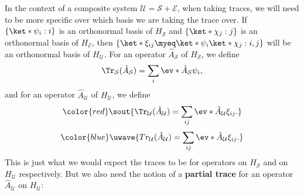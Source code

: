 \documentclass[12pt]{report}
\providecommand{\DIFadd}[1]{{\protect\color{blue}\uwave{#1}}} %
\providecommand{\DIFdel}[1]{{\protect\color{red}\sout{#1}}}                      %
\providecommand{\DIFaddbegin}{} %
\providecommand{\DIFaddend}{} %
\providecommand{\DIFdelbegin}{} %
\providecommand{\DIFdelend}{} %
\begin{document}
    In the context of a composite system $\mathcal{U}=\mathcal{S}+\mathcal{E}$, 
    when taking traces, we will need to be more specific over which basis we are taking the trace over. 
     If $\{\ket*{\psi_i}:i\}$ is an orthonormal basis of $H_\mathcal{S}$ and $\{\ket*{\chi_j}:j\}$ 
     is an orthonormal basis of $H_\mathcal{E}$, 
     then $\{\ket*{\xi_{ij}}\myeq\ket*{\psi_i}\ket*{\chi_j}:i,j\}$ 
     will be an orthonormal basis of $H_\mathcal{U}$. 
     For an operator $\hat{A}_\mathcal{S}$ of $H_\mathcal{S}$, we define 
    $$\Tr_\mathcal{S}(\hat{A}_\mathcal{S})=\sum_i \ev*{\hat{A}_\mathcal{S}}{\psi_i},$$
     and for an operator $\hat{A}_\mathcal{U}$ of $H_\mathcal{U}$, we define 
     \DIFdelbegin \begin{displaymath}\DIFdel{\Tr_\mathcal{U}(\hat{A}_\mathcal{U})=\sum_{ij} \ev*{\hat{A}_\mathcal{U}}{\xi_{ij}}.}\end{displaymath}%
\DIFdelend \DIFaddbegin \begin{equation}\DIFadd{\label{fulltrace}Tr_\mathcal{U}(\hat{A}_\mathcal{U})=\sum_{ij} \ev*{\hat{A}_\mathcal{U}}{\xi_{ij}}.
    }\end{equation}\DIFaddend  
    This  %
% 
    is just what we would expect the traces to be for operators on $H_\mathcal{S}$ and on $H_\mathcal{U}$ respectively. But we also need the notion of a \textbf{partial trace} for an operator $\hat{A}_\mathcal{U}$ on $H_\mathcal{U}$: 
\end{document}
